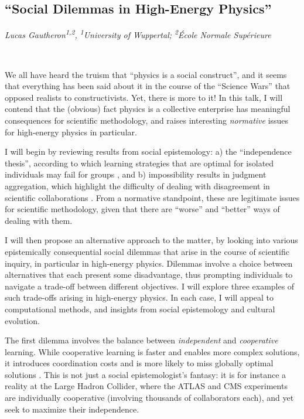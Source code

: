 \documentclass[11pt]{article}
\begin{document}
\ 

\newrefsection
\subsection*{\textsf{``Social Dilemmas in High-Energy
Physics''}}
\textcolor{moderncvgreen}{
\textit{Lucas Gautheron\textsuperscript{1,2},
\newline\textsuperscript{1}University of Wuppertal; \textsuperscript{2}École Normale Supérieure
}
}

\

We all have heard the truism that ``physics is a social construct'', and it seems that everything has been said about it in the course of the ``Science Wars'' that opposed realists to constructivists. Yet, there is more to it! In this talk, I will contend that the (obvious) fact physics is a collective enterprise has meaningful consequences for scientific methodology, and raises interesting \textit{normative} issues for high-energy physics in particular.

I will begin by reviewing results from social epistemology: a) the ``independence thesis'', according to which learning strategies that are optimal for isolated individuals may fail for groups \cite{MayoWilson2011}, and b) impossibility results in judgment aggregation, which highlight the difficulty of dealing with disagreement in scientific collaborations \cite{list2002aggregating,Marcoci2020}. From a normative standpoint, these are legitimate issues for scientific methodology, given that there are ``worse'' and ``better'' ways of dealing with them.

I will then propose an alternative approach to the matter, by looking into various epistemically consequential social dilemmas that arise in the course of scientific inquiry, in particular in high-energy physics. Dilemmas involve a choice between alternatives that each present some disadvantage, thus prompting individuals to navigate a trade-off between different objectives. I will explore three examples of such trade-offs arising in high-energy physics. In each case, I will appeal to computational methods, and insights from social epistemology and cultural evolution.

The first dilemma involves the balance between \textit{independent} and \textit{cooperative} learning.  While cooperative learning is faster and enables more complex solutions, it introduces coordination costs and is more likely to miss globally optimal solutions \cite{Smaldino2023,Zollman2009}. This is not just a social epistemologist's fantasy: it is for instance a reality at the Large Hadron Collider, where the ATLAS and CMS experiments are individually cooperative (involving thousands of collaborators each), and yet seek to maximize their independence.
\end{document}
